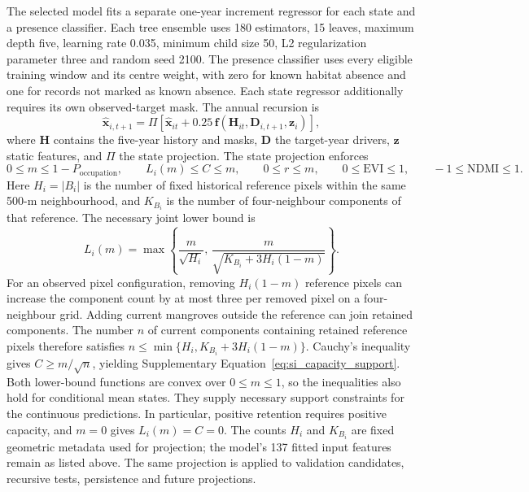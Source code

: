 The selected model fits a separate one-year increment regressor for each state and a presence classifier. Each tree ensemble uses 180 estimators, 15 leaves, maximum depth five, learning rate 0.035, minimum child size 50, L2 regularization parameter three and random seed 2100. The presence classifier uses every eligible training window and its centre weight, with zero for known habitat absence and one for records not marked as known absence. Each state regressor additionally requires its own observed-target mask. The annual recursion is
\begin{equation}\label{eq:si_model}
\widehat{\mathbf{x}}_{i,t+1}=\Pi\!\left[\widehat{\mathbf{x}}_{it}+0.25\,\mathbf{f}(\mathbf{H}_{it},\mathbf{D}_{i,t+1},\mathbf{z}_i)\right],
\end{equation}
where $\mathbf{H}$ contains the five-year history and masks, $\mathbf{D}$ the target-year drivers, $\mathbf{z}$ static features, and $\Pi$ the state projection. The state projection enforces
\begin{equation}\label{eq:si_constraints}
0\leq m\leq1-P_{\mathrm{occupation}},\qquad
L_i(m)\leq C\leq m,\qquad 0\leq r\leq m,\qquad
0\leq\mathrm{EVI}\leq1,\qquad -1\leq\mathrm{NDMI}\leq1.
\end{equation}
Here $H_i=|B_i|$ is the number of fixed historical reference pixels within the same 500-m neighbourhood, and $K_{B_i}$ is the number of four-neighbour components of that reference. The necessary joint lower bound is
\begin{equation}\label{eq:si_capacity_support}
L_i(m)=\max\!\left\{\frac{m}{\sqrt{H_i}},\,
\frac{m}{\sqrt{K_{B_i}+3H_i(1-m)}}\right\}.
\end{equation}
For an observed pixel configuration, removing $H_i(1-m)$ reference pixels can increase the component count by at most three per removed pixel on a four-neighbour grid. Adding current mangroves outside the reference can join retained components. The number $n$ of current components containing retained reference pixels therefore satisfies $n\leq\min\{H_i,K_{B_i}+3H_i(1-m)\}$. Cauchy's inequality gives $C\geq m/\sqrt n$, yielding Supplementary Equation~\eqref{eq:si_capacity_support}. Both lower-bound functions are convex over $0\leq m\leq1$, so the inequalities also hold for conditional mean states. They supply necessary support constraints for the continuous predictions. In particular, positive retention requires positive capacity, and $m=0$ gives $L_i(m)=C=0$. The counts $H_i$ and $K_{B_i}$ are fixed geometric metadata used for projection; the model's 137 fitted input features remain as listed above. The same projection is applied to validation candidates, recursive tests, persistence and future projections.

